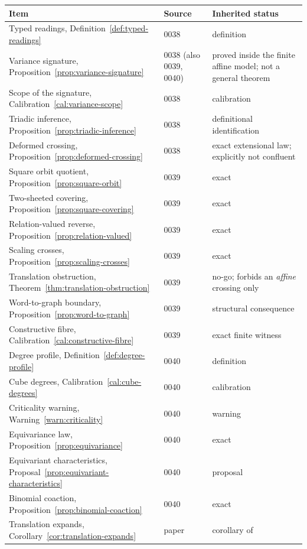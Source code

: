 \begin{longtable}{@{}p{}p{}p{}@{}}
\toprule
Item & Source & Inherited status \\
\midrule
\endhead
Typed readings, Definition~\ref{def:typed-readings} & 0038 & definition \\
Variance signature, Proposition~\ref{prop:variance-signature} & 0038 (also 0039, 0040) &
  proved inside the finite affine model; not a general theorem \\
Scope of the signature, Calibration~\ref{cal:variance-scope} & 0038 & calibration \\
Triadic inference, Proposition~\ref{prop:triadic-inference} & 0038 & definitional
  identification \\
Deformed crossing, Proposition~\ref{prop:deformed-crossing} & 0038 & exact extensional law;
  explicitly not confluent \\
Square orbit quotient, Proposition~\ref{prop:square-orbit} & 0039 & exact \\
Two-sheeted covering, Proposition~\ref{prop:square-covering} & 0039 & exact \\
Relation-valued reverse, Proposition~\ref{prop:relation-valued} & 0039 & exact \\
Scaling crosses, Proposition~\ref{prop:scaling-crosses} & 0039 & exact \\
Translation obstruction, Theorem~\ref{thm:translation-obstruction} & 0039 & no-go; forbids an
  \emph{affine} crossing only \\
Word-to-graph boundary, Proposition~\ref{prop:word-to-graph} & 0039 & structural consequence \\
Constructive fibre, Calibration~\ref{cal:constructive-fibre} & 0039 & exact finite witness \\
Degree profile, Definition~\ref{def:degree-profile} & 0040 & definition \\
Cube degrees, Calibration~\ref{cal:cube-degrees} & 0040 & calibration \\
Criticality warning, Warning~\ref{warn:criticality} & 0040 & warning \\
Equivariance law, Proposition~\ref{prop:equivariance} & 0040 & exact \\
Equivariant characteristics, Proposal~\ref{prop:equivariant-characteristics} & 0040 &
  proposal \\
Binomial coaction, Proposition~\ref{prop:binomial-coaction} & 0040 & exact \\
Translation expands, Corollary~\ref{cor:translation-expands} & paper & corollary of

\end{longtable}
